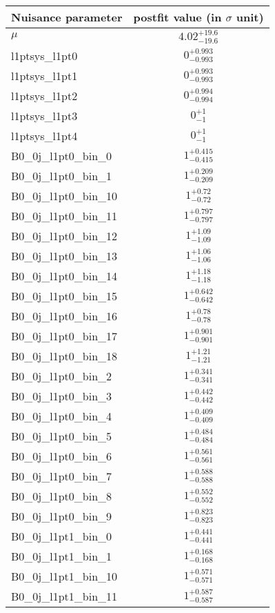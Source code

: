 
\begin{tabular}{|l|c|}
\hline
Nuisance parameter & postfit value (in $\sigma$ unit) \\\hline
$\mu$ & $4.02^{+19.6}_{-19.6}$ \\
l1ptsys\_l1pt0 & $0^{+0.993}_{-0.993}$ \\
l1ptsys\_l1pt1 & $0^{+0.993}_{-0.993}$ \\
l1ptsys\_l1pt2 & $0^{+0.994}_{-0.994}$ \\
l1ptsys\_l1pt3 & $0^{+1}_{-1}$ \\
l1ptsys\_l1pt4 & $0^{+1}_{-1}$ \\
B0\_0j\_l1pt0\_bin\_0 & $1^{+0.415}_{-0.415}$ \\
B0\_0j\_l1pt0\_bin\_1 & $1^{+0.209}_{-0.209}$ \\
B0\_0j\_l1pt0\_bin\_10 & $1^{+0.72}_{-0.72}$ \\
B0\_0j\_l1pt0\_bin\_11 & $1^{+0.797}_{-0.797}$ \\
B0\_0j\_l1pt0\_bin\_12 & $1^{+1.09}_{-1.09}$ \\
B0\_0j\_l1pt0\_bin\_13 & $1^{+1.06}_{-1.06}$ \\
B0\_0j\_l1pt0\_bin\_14 & $1^{+1.18}_{-1.18}$ \\
B0\_0j\_l1pt0\_bin\_15 & $1^{+0.642}_{-0.642}$ \\
B0\_0j\_l1pt0\_bin\_16 & $1^{+0.78}_{-0.78}$ \\
B0\_0j\_l1pt0\_bin\_17 & $1^{+0.901}_{-0.901}$ \\
B0\_0j\_l1pt0\_bin\_18 & $1^{+1.21}_{-1.21}$ \\
B0\_0j\_l1pt0\_bin\_2 & $1^{+0.341}_{-0.341}$ \\
B0\_0j\_l1pt0\_bin\_3 & $1^{+0.442}_{-0.442}$ \\
B0\_0j\_l1pt0\_bin\_4 & $1^{+0.409}_{-0.409}$ \\
B0\_0j\_l1pt0\_bin\_5 & $1^{+0.484}_{-0.484}$ \\
B0\_0j\_l1pt0\_bin\_6 & $1^{+0.561}_{-0.561}$ \\
B0\_0j\_l1pt0\_bin\_7 & $1^{+0.588}_{-0.588}$ \\
B0\_0j\_l1pt0\_bin\_8 & $1^{+0.552}_{-0.552}$ \\
B0\_0j\_l1pt0\_bin\_9 & $1^{+0.823}_{-0.823}$ \\
B0\_0j\_l1pt1\_bin\_0 & $1^{+0.441}_{-0.441}$ \\
B0\_0j\_l1pt1\_bin\_1 & $1^{+0.168}_{-0.168}$ \\
B0\_0j\_l1pt1\_bin\_10 & $1^{+0.571}_{-0.571}$ \\
B0\_0j\_l1pt1\_bin\_11 & $1^{+0.587}_{-0.587}$ \\

\end{tabular}
